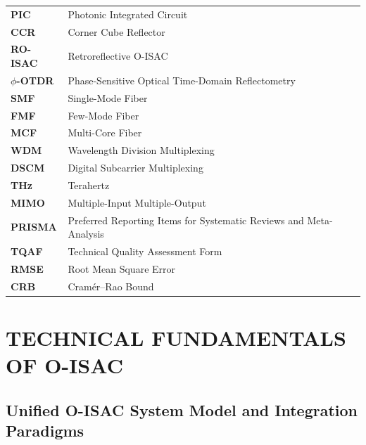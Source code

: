 \documentclass[letterpaper,journal]{IEEEtran}
\begin{document}
\begin{table}[!t]
\begin{tabularx}{\columnwidth}{@{}>{\raggedright\arraybackslash}p{}>{\raggedright\arraybackslash}X@{}}
        \textbf{PIC}         & Photonic Integrated Circuit                                        \\
        \textbf{CCR}         & Corner Cube Reflector                                              \\
        \textbf{RO-ISAC}     & Retroreflective O-ISAC                                             \\
        \textbf{$\phi$-OTDR} & Phase-Sensitive Optical Time-Domain Reflectometry                  \\
        \textbf{SMF}         & Single-Mode Fiber                                                  \\
        \textbf{FMF}         & Few-Mode Fiber                                                     \\
        \textbf{MCF}         & Multi-Core Fiber                                                   \\
        \textbf{WDM}         & Wavelength Division Multiplexing                                   \\
        \textbf{DSCM}        & Digital Subcarrier Multiplexing                                    \\
        \textbf{THz}         & Terahertz                                                          \\
        \textbf{MIMO}        & Multiple-Input Multiple-Output                                     \\
        \textbf{PRISMA}      & Preferred Reporting Items for Systematic Reviews and Meta-Analysis \\
        \textbf{TQAF}        & Technical Quality Assessment Form                                  \\
        \textbf{RMSE}        & Root Mean Square Error                                             \\
        \textbf{CRB}         & Cram\'er--Rao Bound                                                \\
        \bottomrule
    \end{tabularx}
\end{table}



\section{TECHNICAL FUNDAMENTALS OF O-ISAC}
\subsection{Unified O-ISAC System Model and Integration Paradigms}
\end{document}
